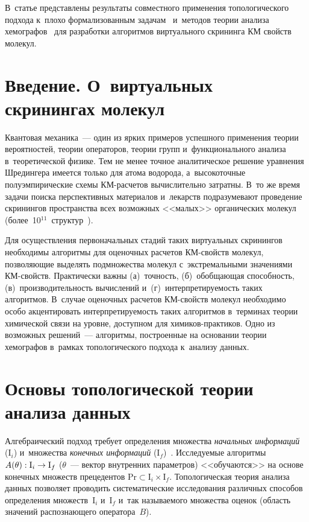 \begin{multicols}{2}
В~статье пред\-став\-ле\-ны результаты совместного 
применения топологического подхода к~плохо формализованным 
задачам~\cite{6-tr} и~методов теории анализа хемографов~\cite{7-tr, 8-tr} для 
разработки алгоритмов виртуального скрининга  
КМ свойств молекул.

\section{Введение. О~виртуальных скринингах молекул}

     Квантовая механика~--- один из ярких примеров успешного 
применения теории вероятностей, теории операторов, теории групп 
и~функционального анализа в~теоретической физике. Тем не менее точное 
аналитическое решение уравнения Шредингера имеется только для атома 
водорода, а~высокоточные полуэмпирические схемы КМ-рас\-че\-тов 
вычислительно затратны. В~то же время задачи поиска перспективных 
материалов и~лекарств подразумевают проведение скринингов пространства 
всех возможных <<малых>> органических молекул 
(более~10$^{11}$~структур~\cite{10-tr}).
     
     Для осуществления первоначальных стадий таких виртуальных 
скринингов необходимы алгоритмы для оценочных расчетов КМ-свойств 
молекул, позволяющие выделять подмножества \mbox{молекул} с~экстремальными 
значениями КМ-свойств. Практически важны (а)~точ\-ность, (б)~обоб\-ща\-ющая 
способность, (в)~производительность вычислений и~(г)~интерпретируемость 
таких алгоритмов. В~случае оценочных расчетов КМ-свойств молекул 
необходимо особо акцентировать интерпретируемость таких алгоритмов 
в~терминах теории химической связи на уровне, доступном для химиков-прак\-ти\-ков. 
Одно из возможных решений~--- алгоритмы, построенные на 
основании теории хемографов в~рамках топологического подхода к~анализу 
данных.

\vspace*{-6pt}
     
\section{Основы топологической теории анализа данных}

\vspace*{-2pt}

     Алгебраический подход требует определения множества \textit{начальных 
информаций} (I$_i$) и~множества \textit{конечных информаций} 
 (I$_f$)~\cite{1-tr}. Исследуемые алгоритмы ${A}(\theta): 
\mathrm{I}_i\hm\to \mathrm{I}_f$ ($\theta$~--- вектор внут\-рен\-них  
па\-ра\-мет\-ров) <<обучаются>> на основе конечных множеств прецедентов 
$\mathrm{Pr}\subset \mathrm{I}_i \times \mathrm{I}_f$. Топологическая теория 
анализа данных позволяет проводить систематические исследования различных 
способов определения множеств~$\mathrm{I}_i$ и~$\mathrm{I}_f$ и~так 
называемого множества оценок (об\-ласть значений распознающего 
оператора~${B}$).


\end{multicols}
